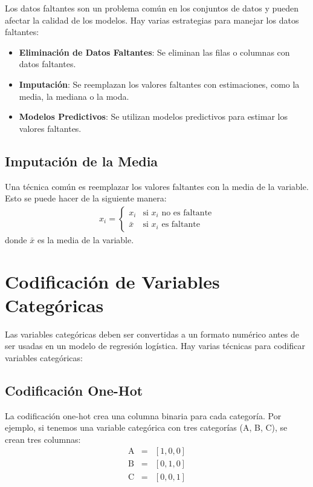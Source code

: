 Los datos faltantes son un problema com\'un en los conjuntos de datos y pueden afectar la calidad de los modelos. Hay varias estrategias para manejar los datos faltantes:
\begin{itemize}
    \item \textbf{Eliminaci\'on de Datos Faltantes}: Se eliminan las filas o columnas con datos faltantes.
    \item \textbf{Imputaci\'on}: Se reemplazan los valores faltantes con estimaciones, como la media, la mediana o la moda.
    \item \textbf{Modelos Predictivos}: Se utilizan modelos predictivos para estimar los valores faltantes.
\end{itemize}

\subsection{Imputaci\'on de la Media}

Una t\'ecnica com\'un es reemplazar los valores faltantes con la media de la variable. Esto se puede hacer de la siguiente manera:
\begin{eqnarray*}
x_i = \begin{cases} 
      x_i & \text{si } x_i \text{ no es faltante} \\
      \bar{x} & \text{si } x_i \text{ es faltante}
   \end{cases}
\end{eqnarray*}
donde $\bar{x}$ es la media de la variable.

\section{Codificaci\'on de Variables Categ\'oricas}

Las variables categ\'oricas deben ser convertidas a un formato num\'erico antes de ser usadas en un modelo de regresi\'on log\'istica. Hay varias t\'ecnicas para codificar variables categ\'oricas:

\subsection{Codificaci\'on One-Hot}

La codificaci\'on one-hot crea una columna binaria para cada categor\'ia. Por ejemplo, si tenemos una variable categ\'orica con tres categor\'ias (A, B, C), se crean tres columnas:
\begin{eqnarray*}
\text{A} &=& [1, 0, 0] \\
\text{B} &=& [0, 1, 0] \\
\text{C} &=& [0, 0, 1]
\end{eqnarray*}

